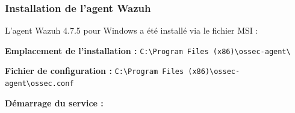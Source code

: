\subsubsection{Installation de l'agent
Wazuh}\label{installation-de-lagent-wazuh-1}

L'agent Wazuh 4.7.5 pour Windows a été installé via le fichier MSI :

\begin{Shaded}
\begin{Highlighting}[]
\OperatorTok{/}\OperatorTok{:} \OperatorTok{/}\OperatorTok{=}\OperatorTok{=}\OperatorTok{=}
\end{Highlighting}
\end{Shaded}

\textbf{Emplacement de l'installation :}
\texttt{C:\textbackslash{}Program\ Files\ (x86)\textbackslash{}ossec-agent\textbackslash{}}

\textbf{Fichier de configuration :}
\texttt{C:\textbackslash{}Program\ Files\ (x86)\textbackslash{}ossec-agent\textbackslash{}ossec.conf}

\begin{Shaded}
\begin{Highlighting}[]
\NormalTok{\textless{}}\NormalTok{\textgreater{}}
\NormalTok{  \textless{}}\NormalTok{\textgreater{}}
\NormalTok{    \textless{}}\NormalTok{\textgreater{}}
\NormalTok{    \textless{}}\NormalTok{\textgreater{}}
\NormalTok{  \textless{}/}\NormalTok{\textgreater{}}
\NormalTok{\textless{}/}\NormalTok{\textgreater{}}
\end{Highlighting}
\end{Shaded}

\textbf{Démarrage du service :}

\begin{Shaded}
\begin{Highlighting}[]
 \OperatorTok{{-}}
 \OperatorTok{{-}}
\end{Highlighting}
\end{Shaded}

